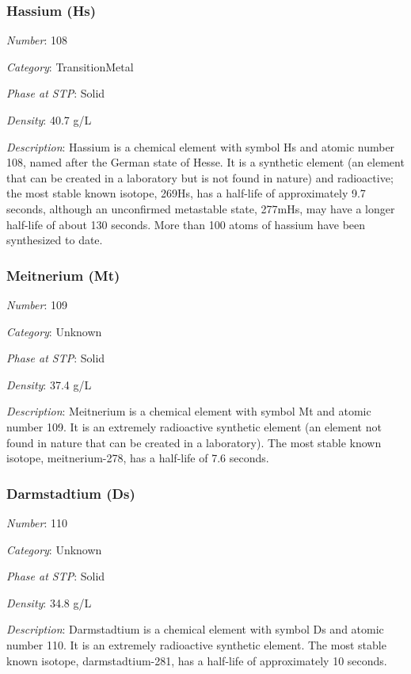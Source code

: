 \documentclass{article}
\begin{document}
\hypertarget{subsubsection::Hs}{}\subsubsection{Hassium (Hs)}

\textit{Number}: 108

\textit{Category}: TransitionMetal

\textit{Phase at STP}: Solid

\textit{Density}: 40.7 g/L

\textit{Description}: Hassium is a chemical element with symbol Hs and atomic number 108, named after the German state of Hesse. It is a synthetic element (an element that can be created in a laboratory but is not found in nature) and radioactive; the most stable known isotope, 269Hs, has a half-life of approximately 9.7 seconds, although an unconfirmed metastable state, 277mHs, may have a longer half-life of about 130 seconds. More than 100 atoms of hassium have been synthesized to date.

\hypertarget{subsubsection::Mt}{}\subsubsection{Meitnerium (Mt)}

\textit{Number}: 109

\textit{Category}: Unknown

\textit{Phase at STP}: Solid

\textit{Density}: 37.4 g/L

\textit{Description}: Meitnerium is a chemical element with symbol Mt and atomic number 109. It is an extremely radioactive synthetic element (an element not found in nature that can be created in a laboratory). The most stable known isotope, meitnerium-278, has a half-life of 7.6 seconds.

\hypertarget{subsubsection::Ds}{}\subsubsection{Darmstadtium (Ds)}

\textit{Number}: 110

\textit{Category}: Unknown

\textit{Phase at STP}: Solid

\textit{Density}: 34.8 g/L

\textit{Description}: Darmstadtium is a chemical element with symbol Ds and atomic number 110. It is an extremely radioactive synthetic element. The most stable known isotope, darmstadtium-281, has a half-life of approximately 10 seconds.
\end{document}
